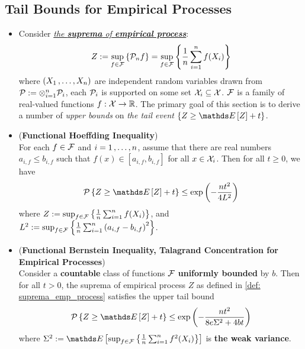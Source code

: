 \documentclass[11pt]{article}
\begin{document}
\subsection{Tail Bounds for Empirical Processes}
\begin{itemize}
\item \begin{remark}
Consider \underline{\emph{the \textbf{suprema} of \textbf{empirical process}}}:
\begin{align}
Z := \sup_{f \in {\mathcal F}}\left\{{\mathcal P}_n f\right\} =  \sup_{f \in {\mathcal F}}\left\{ \frac{1}{n}\sum_{i=1}^n f(X_i)\right\} \label{def: suprema_emp_process}
\end{align} where $(X_1 \,{,}\ldots{,}\, X_n)$ are independent random variables drawn from ${\mathcal P} := \otimes_{i=1}^{n}{\mathcal P}_i$,  each ${\mathcal P}_i$ is supported on some set ${\mathcal X}_i \subseteq {\mathcal X}$.  ${\mathcal F}$ is a family of real-valued functions $f: {\mathcal X} \to {\mathbb R}$. The primary goal of this section is to derive a number of \emph{upper bounds} on \emph{the tail event} $\set{Z \ge \E{}{Z} + t}$.
\end{remark}

\item \begin{theorem}  (\textbf{Functional Hoeffding Inequality}) \citep{wainwright2019high, boucheron2013concentration}\\
For each $f \in {\mathcal F}$ and $i = 1 \,{,}\ldots{,}\, n$, assume that there are real numbers $a_{i,f} \le b_{i,f}$ such that $f(x) \in [a_{i,f},  b_{i,f}]$ for all $x \in {\mathcal X}_i$.
Then for all $t \ge 0$, we have
\begin{align}
\cP\set{Z \ge \E{}{Z} + t} \le \exp\paren{-\frac{n t^2}{4 L^2}} \label{ineqn: hoeffding_inequality_functional}
\end{align} where $Z :=\sup_{f \in {\mathcal F}}\left\{ \frac{1}{n}\sum_{i=1}^n f(X_i)\right\}$, and $L^2 := \sup_{f \in {\mathcal F}}\left\{\frac{1}{n}\sum_{i=1}^{n}\left(a_{i,f} - b_{i,f}\right)^2\right\}$.
\end{theorem}

\item \begin{theorem}(\textbf{Functional Bernstein Inequality, Talagrand Concentration for Empirical Processes})  \citep{wainwright2019high, boucheron2013concentration}\\
Consider a \textbf{countable} class of functions ${\mathcal F}$ \textbf{uniformly bounded} by $b$. Then for all  $t > 0$, the suprema of empirical process $Z$ as defined in \eqref{def: suprema_emp_process} satisfies the upper tail bound
\begin{align}
\cP\set{Z \ge \E{}{Z} + t} \le \exp\paren{-\frac{n t^2}{8e\Sigma^2 + 4bt}} \label{ineqn: bernstein_inequality_functional}
\end{align} where $\Sigma^2 := \E{}{\sup_{f \in \cF}\set{\frac{1}{n}\sum_{i=1}^{n}f^2(X_i)}}$ is \textbf{the weak variance}.
\end{theorem}


\end{itemize}
\end{document}
